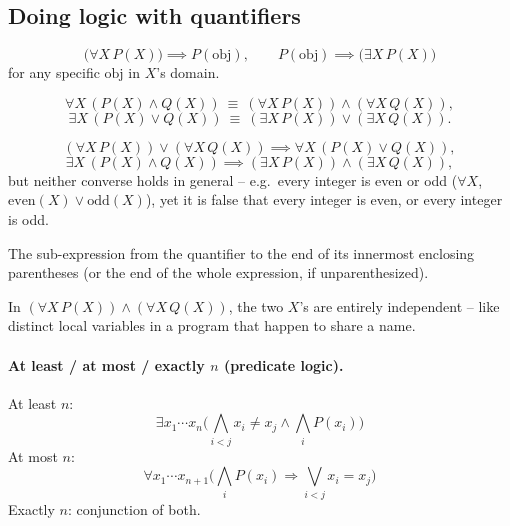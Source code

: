 \subsection{Doing logic with quantifiers}
\label{sec:5-12}

\begin{note}
\[
\big(\forall X\, P(X)\big) \implies P(\mathrm{obj}), \qquad P(\mathrm{obj}) \implies \big(\exists X\, P(X)\big)
\]
for any specific $\mathrm{obj}$ in $X$'s domain.
\end{note}

\begin{proposition}
\[
\forall X\,(P(X)\wedge Q(X)) \ \equiv\ (\forall X\, P(X)) \wedge (\forall X\, Q(X)),
\]
\[
\exists X\,(P(X)\vee Q(X)) \ \equiv\ (\exists X\, P(X)) \vee (\exists X\, Q(X)).
\]
\end{proposition}

\begin{note}
\[
(\forall X\, P(X)) \vee (\forall X\, Q(X)) \implies \forall X\,(P(X)\vee Q(X)),
\]
\[
\exists X\,(P(X)\wedge Q(X)) \implies (\exists X\, P(X)) \wedge (\exists X\, Q(X)),
\]
but neither converse holds in general -- e.g.\ every integer is even or odd ($\forall X$, $\mathrm{even}(X)\vee\mathrm{odd}(X)$), yet it is false that every integer is even, or every integer is odd.
\end{note}

\begin{definition}
The sub-expression from the quantifier to the end of its innermost enclosing parentheses (or the end of the whole expression, if unparenthesized).
\end{definition}

\begin{example}
In $(\forall X\, P(X)) \wedge (\forall X\, Q(X))$, the two $X$'s are entirely independent -- like distinct local variables in a program that happen to share a name.
\end{example}

\paragraph{At least / at most / exactly $n$ (predicate logic).}
At least $n$:
\[
\exists x_1\cdots x_n\Big(\bigwedge_{i<j}x_i\neq x_j \wedge \bigwedge_i P(x_i)\Big)
\]
At most $n$:
\[
\forall x_1\cdots x_{n+1}\Big(\bigwedge_i P(x_i)\Rightarrow \bigvee_{i<j}x_i=x_j\Big)
\]
Exactly $n$: conjunction of both.

